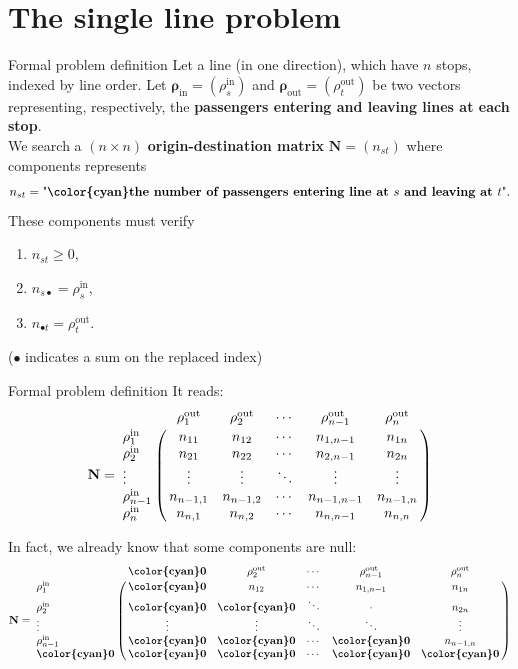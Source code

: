 \documentclass[10pt]{beamer}
\newcommand{\imp}[1]{\textbf{\color{cyan}#1}}
\begin{document}
	\section{The single line problem}
	
	
	\begin{frame}{Formal problem definition}
		Let a line (in one direction), which have $n$ stops, indexed by line order. Let $\bm{\rho}_\text{in} = (\rho^\text{in}_s)$ and $\bm{\rho}_\text{out} = (\rho^\text{out}_t)$ be two vectors representing, respectively, the \imp{passengers entering and leaving lines at each stop}. \\
		\vspace{0.4cm}
		We search a $(n \times n)$ \imp{origin-destination matrix} $\mathbf{N} = (n_{st})$ where components represents
		$$
			n_{st} = \text{"\imp{the number of passengers entering line at $s$ and leaving at $t$}"}.
		$$
		These components must verify
		\begin{enumerate}
			\item $n_{st} \geq 0$,
			\item $n_{s\bullet} = \rho^\text{in}_s$,
			\item $n_{\bullet t} = \rho^\text{out}_t$.
		\end{enumerate}
		\small ($\bullet$ indicates a sum on the replaced index)
	\end{frame}
	
	
	\begin{frame}{Formal problem definition}
		\small
		It reads:
		$$
		\mathbf{N} = \bordermatrix{
			& \rho^\text{out}_1 & \rho^\text{out}_2  & \cdots & \rho^\text{out}_{n-1} & \rho^\text{out}_n   \cr
			\rho^\text{in}_1 & n_{11} & n_{12} & \cdots & n_{1,n-1} & n_{1n} \cr
			\rho^\text{in}_2 & n_{21} & n_{22} & \cdots & n_{2,n-1} & n_{2n} \cr
			\vdots & \vdots & \vdots & \ddots & \vdots & \vdots \cr
			\rho^\text{in}_{n-1} & n_{n-1,1} & n_{n-1,2} & \cdots & n_{n-1,n-1} & n_{n-1,n} \cr
			\rho^\text{in}_{n} & n_{n,1} & n_{n,2} & \cdots & n_{n,n-1} & n_{n,n}}
		$$
		
		In fact, we already know that some components are null:
		$$
		\mathbf{N} = \bordermatrix{
			& \imp{0} & \rho^\text{out}_2  & \cdots & \rho^\text{out}_{n-1} & \rho^\text{out}_n \cr
			\rho^\text{in}_1 & \imp{0} & n_{12} & \cdots & n_{1,n-1} & n_{1n} \cr
			\rho^\text{in}_2 & \imp{0} & \imp{0} & \ddots & \cdot & n_{2n} \cr
			\vdots & \vdots & \vdots & \ddots & \ddots & \vdots \cr
			\rho^\text{in}_{n-1} & \imp{0} & \imp{0} & \cdots & \imp{0} & n_{n-1,n} \cr
			\imp{0} & \imp{0} & \imp{0} & \cdots & \imp{0} & \imp{0}}
		$$
	\end{frame}
	
\end{document}
